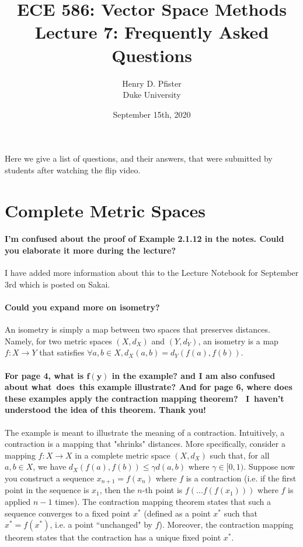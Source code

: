 \documentclass[10pt,english]{article}
\begin{document}
\title{ECE 586: Vector Space Methods \\ Lecture 7: Frequently Asked Questions}
\author{Henry D. Pfister \\ Duke University}
\date{September 15th, 2020}

\maketitle

Here we give a list of questions, and their answers, that were submitted by students after watching the flip video.

\section{Complete Metric Spaces}

\paragraph{I'm confused about the proof of Example 2.1.12 in the notes. Could you elaborate it more during the lecture?}

I have added more information about this to the Lecture Notebook for September 3rd which is posted on Sakai.


\paragraph{Could you expand more on isometry?}

An isometry is simply a map between two spaces that preserves distances.
Namely, for two metric spaces $(X,d_X)$ and $(Y,d_Y)$, an isometry is a map $f: X \rightarrow Y$ that satisfies $\forall a,b \in X, d_X(a,b) = d_Y(f(a),f(b))$.

\paragraph{For page 4, what is $\boldsymbol{f(y)}$ in the example? and I am also confused about what does this example illustrate? And for page 6, where does these examples apply the contraction mapping theorem?  I haven't understood the idea of this theorem. Thank you!}

The example is meant to illustrate the meaning of a contraction. Intuitively, a contraction is a mapping that "shrinks" distances. More specifically, consider a mapping $f: X \rightarrow X$ in a complete metric space $(X,d_X)$ such that, for all $a,b \in X$, we have $d_X(f(a),f(b)) \leq \gamma d(a,b)$ where $\gamma \in [0,1)$.
Suppose now you construct a sequence $x_{n+1} = f(x_n)$ where $f$ is a contraction (i.e. if the first point in the sequence is $x_1$, then the $n$-th point is $f(...f(f(x_1)))$ where $f$ is applied $n-1$ times). The contraction mapping theorem states that such a sequence converges to a fixed point $x^*$ (defined as a point $x^*$ such that $x^* = f(x^*)$, i.e. a point ``unchanged" by $f$). Moreover, the contraction mapping theorem states that the contraction has a unique fixed point $x^*$.
\end{document}

